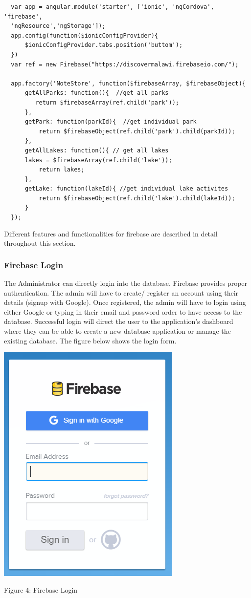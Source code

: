 \begin{verbatim}
  var app = angular.module('starter', ['ionic', 'ngCordova', 'firebase',
  'ngResource','ngStorage']);
  app.config(function($ionicConfigProvider){
	  $ionicConfigProvider.tabs.position('buttom');
  })
  var ref = new Firebase("https://discovermalawi.firebaseio.com/");
  
  app.factory('NoteStore', function($firebaseArray, $firebaseObject){
	  getAllParks: function(){  //get all parks
		 return $firebaseArray(ref.child('park'));
	  },
	  getPark: function(parkId){  //get individual park
		  return $firebaseObject(ref.child('park').child(parkId));
	  },
	  getAllLakes: function(){ // get all lakes
	  lakes = $firebaseArray(ref.child('lake'));
		  return lakes;
	  },
	  getLake: function(lakeId){ //get individual lake activites
		  return $firebaseObject(ref.child('lake').child(lakeId));
	  }  
  });
\end{verbatim} 
Different features and functionalities for firebase are described in detail throughout this section.

\subsubsection{Firebase Login}
The Administrator can directly login into the database. Firebase provides proper authentication. The admin will have to create/ register an account using their details (signup with Google). Once registered, the admin will have to login using either Google or typing in their email and password order to have access to the database. Successful login will direct the user to the application’s dashboard where they can be able to create a new database application or manage the existing database. The figure below shows the login form.

\begin{center}    
	\includegraphics{img/firebaseLogin.png}
\end{center}
\begin{center}
	Figure 4: Firebase Login 
\end{center}

